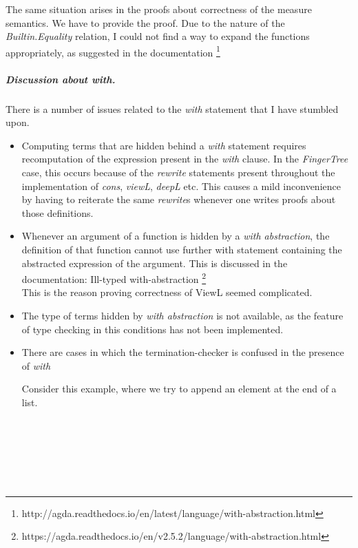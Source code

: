 \documentclass[12pt,twoside,notitlepage]{report}
\begin{document}
The same situation arises in the proofs about correctness of the measure semantics. We have to provide the proof. Due to the nature of the \textit{Builtin.Equality} relation, I could not find a way to expand the functions appropriately, as suggested in the documentation \footnote{http://agda.readthedocs.io/en/latest/language/with-abstraction.html}


\subparagraph{Discussion about \textit{with}.}There is a number of issues related to the \textit{with} statement that I have stumbled upon.

\begin{itemize}
\item Computing terms that are hidden behind a \textit{with} statement requires recomputation of the expression present in the \textit{with} clause. In the \textit{FingerTree} case, this occurs because of the \textit{rewrite} statements present throughout the implementation of \textit{cons}, \textit{viewL}, \textit{deepL} etc. This causes a mild inconvenience by having to reiterate the same \textit{rewrite}s whenever one writes proofs about those definitions.

\item Whenever an argument of a function is hidden by a \textit{with abstraction}, the definition of that function cannot use further with statement containing the abstracted expression of the argument. This is discussed in the documentation: Ill-typed with-abstraction \footnote{https://agda.readthedocs.io/en/v2.5.2/language/with-abstraction.html} \\
This is the reason proving correctness of ViewL seemed complicated.

\item The type of terms hidden by \textit{with abstraction} is not available, as the feature of type checking in this conditions has not been implemented.

\item There are cases in which the termination-checker is confused in the presence of \textit{with}

Consider this example, where we try to append an element at the end of a list.

\begin{code}
\\
\> \AgdaSymbol{:}  \AgdaSymbol{\{}\AgdaSymbol{\}}        \<%
\\
\>    \<%
\\
\>   \AgdaSymbol{|} \AgdaInductiveConstructor{[]} \AgdaSymbol{=}   \AgdaInductiveConstructor{[]}\<%
\\
\>   \AgdaSymbol{|}    \AgdaSymbol{=}   \AgdaSymbol{(}  \AgdaSymbol{)}\<%
\\
\end{code} 


\end{itemize}
\end{document}

